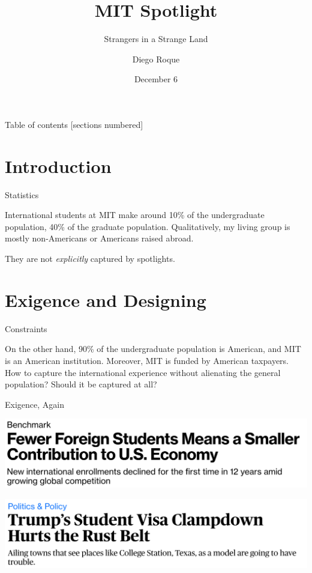 \documentclass[10pt]{beamer}
\title{MIT Spotlight}
\subtitle{Strangers in a Strange Land}
\date{December 6}
\author{Diego Roque}
\institute{MIT}
\begin{document}
\maketitle

\begin{frame}{Table of contents}
  [sections numbered]
  \tableofcontents[hideallsubsections]
\end{frame}

\section{Introduction}

\begin{frame}[fragile]{Statistics}

International students at MIT make 
around 10\% of the undergraduate population, 40\% of the graduate population. Qualitatively, my living group is mostly non-Americans 
or Americans raised abroad.

They are not \textit{explicitly} captured by spotlights.

\end{frame}

\section{Exigence and Designing}

\begin{frame}{Constraints}

On the other hand, 90\% of the undergraduate population is American,
and MIT is an American institution. Moreover, MIT is funded by
American taxpayers. How to capture the international 
experience without alienating the general population? Should it be 
captured at all?

\end{frame}

\begin{frame}{Exigence, Again}

\begin{center}
\includegraphics[scale=0.2]{fewer_foreign.png}
\end{center}


\begin{center}
\includegraphics[scale=0.2]{rust_belt_visa.png}
\end{center}

\end{frame}
\end{document}
